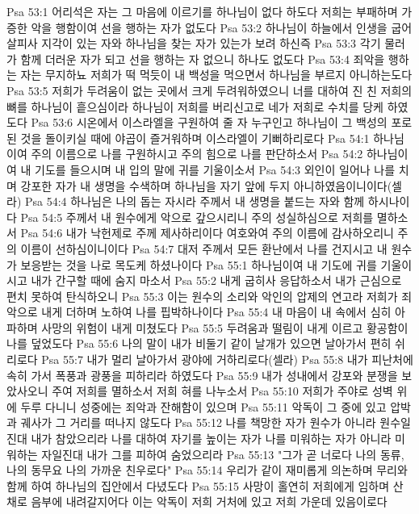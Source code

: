 Psa 53:1  어리석은 자는 그 마음에 이르기를 하나님이 없다 하도다 저희는 부패하며 가증한 악을 행함이여 선을 행하는 자가 없도다
Psa 53:2  하나님이 하늘에서 인생을 굽어 살피사 지각이 있는 자와 하나님을 찾는 자가 있는가 보려 하신즉
Psa 53:3  각기 물러가 함께 더러운 자가 되고 선을 행하는 자 없으니 하나도 없도다
Psa 53:4  죄악을 행하는 자는 무지하뇨 저희가 떡 먹듯이 내 백성을 먹으면서 하나님을 부르지 아니하는도다
Psa 53:5  저희가 두려움이 없는 곳에서 크게 두려워하였으니 너를 대하여 진 친 저희의 뼈를 하나님이 흩으심이라 하나님이 저희를 버리신고로 네가 저희로 수치를 당케 하였도다
Psa 53:6  시온에서 이스라엘을 구원하여 줄 자 누구인고 하나님이 그 백성의 포로된 것을 돌이키실 때에 야곱이 즐거워하며 이스라엘이 기뻐하리로다
Psa 54:1  하나님이여 주의 이름으로 나를 구원하시고 주의 힘으로 나를 판단하소서
Psa 54:2  하나님이여 내 기도를 들으시며 내 입의 말에 귀를 기울이소서
Psa 54:3  외인이 일어나 나를 치며 강포한 자가 내 생명을 수색하며 하나님을 자기 앞에 두지 아니하였음이니이다(셀라)
Psa 54:4  하나님은 나의 돕는 자시라 주께서 내 생명을 붙드는 자와 함께 하시나이다
Psa 54:5  주께서 내 원수에게 악으로 갚으시리니 주의 성실하심으로 저희를 멸하소서
Psa 54:6  내가 낙헌제로 주께 제사하리이다 여호와여 주의 이름에 감사하오리니 주의 이름이 선하심이니이다
Psa 54:7  대저 주께서 모든 환난에서 나를 건지시고 내 원수가 보응받는 것을 나로 목도케 하셨나이다
Psa 55:1  하나님이여 내 기도에 귀를 기울이시고 내가 간구할 때에 숨지 마소서
Psa 55:2  내게 굽히사 응답하소서 내가 근심으로 편치 못하여 탄식하오니
Psa 55:3  이는 원수의 소리와 악인의 압제의 연고라 저희가 죄악으로 내게 더하며 노하여 나를 핍박하나이다
Psa 55:4  내 마음이 내 속에서 심히 아파하며 사망의 위험이 내게 미쳤도다
Psa 55:5  두려움과 떨림이 내게 이르고 황공함이 나를 덮었도다
Psa 55:6  나의 말이 내가 비둘기 같이 날개가 있으면 날아가서 편히 쉬리로다
Psa 55:7  내가 멀리 날아가서 광야에 거하리로다(셀라)
Psa 55:8  내가 피난처에 속히 가서 폭풍과 광풍을 피하리라 하였도다
Psa 55:9  내가 성내에서 강포와 분쟁을 보았사오니 주여 저희를 멸하소서 저희 혀를 나누소서
Psa 55:10  저희가 주야로 성벽 위에 두루 다니니 성중에는 죄악과 잔해함이 있으며
Psa 55:11  악독이 그 중에 있고 압박과 궤사가 그 거리를 떠나지 않도다
Psa 55:12  나를 책망한 자가 원수가 아니라 원수일진대 내가 참았으리라 나를 대하여 자기를 높이는 자가 나를 미워하는 자가 아니라 미워하는 자일진대 내가 그를 피하여 숨었으리라
Psa 55:13  "그가 곧 너로다 나의 동류, 나의 동무요 나의 가까운 친우로다"
Psa 55:14  우리가 같이 재미롭게 의논하며 무리와 함께 하여 하나님의 집안에서 다녔도다
Psa 55:15  사망이 홀연히 저희에게 임하며 산 채로 음부에 내려갈지어다 이는 악독이 저희 거처에 있고 저희 가운데 있음이로다
